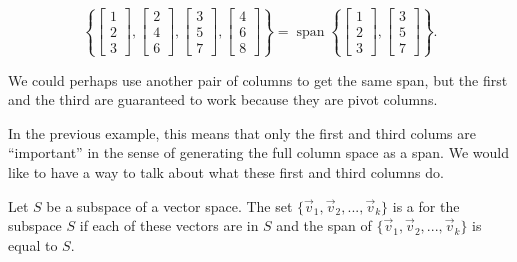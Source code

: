 \begin{exampleSol}
\begin{equation*}
\left\{
\begin{bmatrix}
1 \\
2 \\
3 
\end{bmatrix}
,
\begin{bmatrix}
2 \\
4 \\
6
\end{bmatrix}
,
\begin{bmatrix}
3 \\
5 \\
7
\end{bmatrix}
,
\begin{bmatrix}
4 \\
6 \\
8
\end{bmatrix}
\right\}
=
\operatorname{span}
\left\{
\begin{bmatrix}
1 \\
2 \\
3
\end{bmatrix}
,
\begin{bmatrix}
3 \\
5 \\
7
\end{bmatrix}
\right\} .
\end{equation*}
\end{exampleSol}
We could perhaps use another pair of columns to get the same span, but the
first and the third are guaranteed to work because they are pivot columns. 

In the previous example, this means that only the first and third colums are ``important'' in the sense of generating the full column space as a span. We would like to have a way to talk about what these first and third columns do.

\begin{definition}
Let $S$ be a subspace of a vector space. The set $\{\vec{v}_1, \vec{v}_2, ..., \vec{v}_k\}$ is a \emph{} for the subspace $S$ if each of these vectors are in $S$ and the span of $\{\vec{v}_1, \vec{v}_2, ..., \vec{v}_k\}$ is equal to $S$. 
\end{definition}

